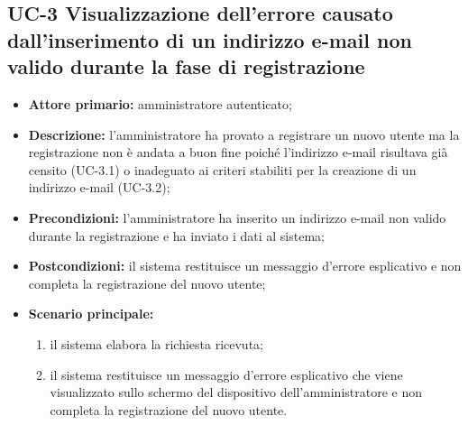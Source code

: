 \subsection{UC-3 Visualizzazione dell'errore causato dall'inserimento di un indirizzo e-mail non valido durante la fase di registrazione}
\begin{itemize}
	\item \textbf{Attore primario:} amministratore autenticato;

	\item \textbf{Descrizione:} l'amministratore ha provato a registrare un nuovo utente ma la registrazione non è andata a buon fine poiché l'indirizzo e-mail risultava già censito (UC-3.1) o inadeguato ai criteri stabiliti per la creazione di un indirizzo e-mail (UC-3.2);

	\item \textbf{Precondizioni:} l'amministratore ha inserito un indirizzo e-mail non valido durante la registrazione e ha inviato i dati al sistema;

	\item \textbf{Postcondizioni:} il sistema restituisce un messaggio d'errore esplicativo e non completa la registrazione del nuovo utente;

	\item \textbf{Scenario principale:}
	      \begin{enumerate}
		      \item il sistema elabora la richiesta ricevuta;
		      \item il sistema restituisce un messaggio d'errore esplicativo che viene visualizzato sullo schermo del dispositivo dell'amministratore e non completa la registrazione del nuovo utente.
	      \end{enumerate}
\end{itemize}

